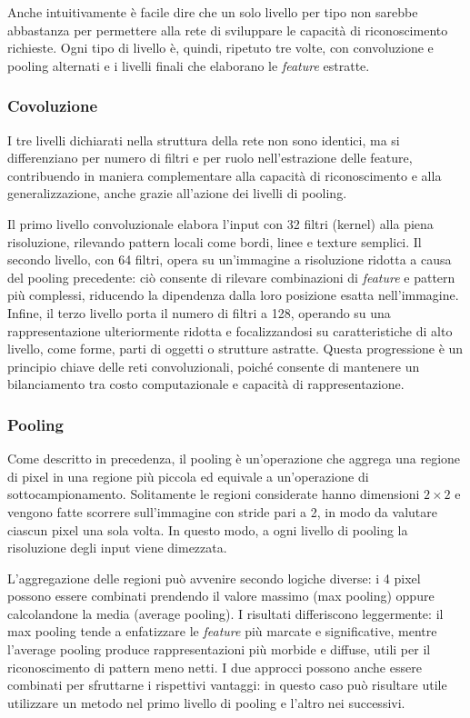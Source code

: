 \documentclass[a4paper,12pt]{article}
\begin{document}
Anche intuitivamente è facile dire che un solo livello per tipo non sarebbe abbastanza per permettere alla rete di sviluppare le capacità di riconoscimento richieste. Ogni tipo di livello è, quindi, ripetuto tre volte, con convoluzione e pooling alternati e i livelli finali che elaborano le \textit{feature} estratte.

\subsubsection{Covoluzione}
I tre livelli dichiarati nella struttura della rete non sono identici, ma si differenziano per numero di filtri e per ruolo nell'estrazione delle feature, contribuendo in maniera complementare alla capacità di riconoscimento e alla generalizzazione, anche grazie all'azione dei livelli di pooling.

Il primo livello convoluzionale elabora l'input con 32 filtri (kernel) alla piena risoluzione, rilevando pattern locali come bordi, linee e texture semplici.
Il secondo livello, con 64 filtri, opera su un'immagine a risoluzione ridotta a causa del pooling precedente: ciò consente di rilevare combinazioni di \textit{feature} e pattern più complessi, riducendo la dipendenza dalla loro posizione esatta nell'immagine.
Infine, il terzo livello porta il numero di filtri a 128, operando su una rappresentazione ulteriormente ridotta e focalizzandosi su caratteristiche di alto livello, come forme, parti di oggetti o strutture astratte.
Questa progressione è un principio chiave delle reti convoluzionali, poiché consente di mantenere un bilanciamento tra costo computazionale e capacità di rappresentazione.

\subsubsection{Pooling} \label{pooling}
Come descritto in precedenza, il pooling è un'operazione che aggrega una regione di pixel in una regione più piccola ed equivale a un'operazione di sottocampionamento. Solitamente le regioni considerate hanno dimensioni $2 \times 2$ e vengono fatte scorrere sull'immagine con stride pari a 2, in modo da valutare ciascun pixel una sola volta. In questo modo, a ogni livello di pooling la risoluzione degli input viene dimezzata.

L'aggregazione delle regioni può avvenire secondo logiche diverse: i 4 pixel possono essere combinati prendendo il valore massimo (max pooling) oppure calcolandone la media (average pooling). I risultati differiscono leggermente: il max pooling tende a enfatizzare le \textit{feature} più marcate e significative, mentre l'average pooling produce rappresentazioni più morbide e diffuse, utili per il riconoscimento di pattern meno netti.
I due approcci possono anche essere combinati per sfruttarne i rispettivi vantaggi: in questo caso può risultare utile utilizzare un metodo nel primo livello di pooling e l'altro nei successivi.
\end{document}

